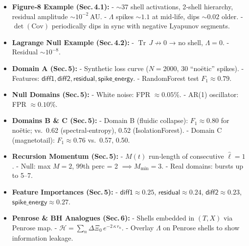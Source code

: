 \documentclass[11pt]{article}
\newcommand{\Contradiction}{\Xi}
\newcommand{\Leak}{\Lambda}
\newcommand{\Curv}{\kappa}
\newcommand{\Hgain}{\mathcal{H}}
\newcommand{\TrJ}{\operatorname{Tr}\,J}
\begin{document}
\begin{itemize}[leftmargin=*]
  \item \textbf{Figure‐8 Example (Sec.\,4.1):}  
    - \(\sim37\) shell activations, 2‐shell hierarchy, residual amplitude \(\sim10^{-2}\) AU.  
    - \(\Leak\) spikes \(\sim1.1\) at mid‐life, dips \(\sim0.02\) older.  
    - \(\det(\mathrm{Cov})\) periodically dips in sync with negative Lyapunov segments.

  \item \textbf{Lagrange Null Example (Sec.\,4.2):}  
    - \(\TrJ \not\to 0\) → no shell, \(\Leak = 0\).  
    - Residual \(\sim10^{-8}\).

  \item \textbf{Domain A (Sec.\,5):}  
    - Synthetic loss curve (\(N=2000\), 30 “noëtic” spikes).  
    - Features: \(\mathsf{diff1}, \mathsf{diff2}, \mathsf{residual}, \mathsf{spike\_energy}\).  
    - RandomForest test \(F_{1} \approx 0.79\).

  \item \textbf{Null Domains (Sec.\,5):}  
    - White noise: FPR \(\approx0.05\%\).  
    - AR(1) oscillator: FPR \(\approx0.10\%\).

  \item \textbf{Domains B \& C (Sec.\,5):}  
    - Domain B (fluidic collapse): \(F_{1} \approx 0.80\) for noëtic; vs.\ 0.62 (spectral‐entropy), 0.52 (IsolationForest).  
    - Domain C (magnetotail): \(F_{1} \approx 0.76\) vs.\ 0.57, 0.50.

  \item \textbf{Recursion Momentum (Sec.\,5):}  
    - \(M(t)\) run‐length of consecutive \(\hat{\ell} = 1\).  
    - Null: max \(M = 2\), 99th perc = 2 \(\implies M_{\min} = 3\).  
    - Real domains: bursts up to 5–7.

  \item \textbf{Feature Importances (Sec.\,5):}  
    - \(\mathsf{diff1} \approx 0.25\), \(\mathsf{residual} \approx 0.24\), \(\mathsf{diff2} \approx 0.23\), \(\mathsf{spike\_energy} \approx 0.27\).

  \item \textbf{Penrose \& BH Analogues (Sec.\,6):}  
    - Shells embedded in \((T,X)\) via Penrose map.  
    - \(\Hgain = \sum_n \Delta\Contradiction_0\,e^{-2\,\Curv\,r_n}.\)  
    - Overlay \(\Leak\) on Penrose shells to show information leakage.
\end{itemize}

\end{document}
